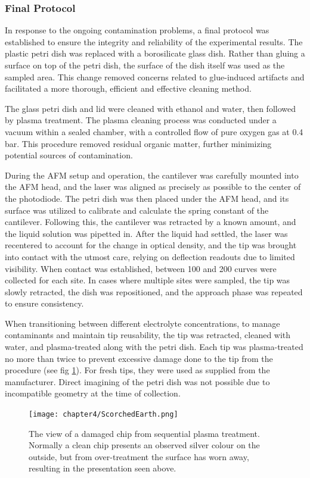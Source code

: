 \subsubsection{Final Protocol}

In response to the ongoing contamination problems, a final protocol was established to ensure the integrity and reliability of the experimental results. The plastic petri dish was replaced with a borosilicate glass dish. Rather than gluing a surface on top of the petri dish, the surface of the dish itself was used as the sampled area. This change removed concerns related to glue-induced artifacts and facilitated a more thorough, efficient and effective cleaning method.

The glass petri dish and lid were cleaned with ethanol and water, then followed by plasma treatment. The plasma cleaning process was conducted under a vacuum within a sealed chamber, with a controlled flow of pure oxygen gas at 0.4 bar. This procedure  removed residual organic matter, further minimizing potential sources of contamination.

During the AFM setup and operation, the cantilever was carefully mounted into the AFM head, and the laser was aligned as precisely as possible to the center of the photodiode. The petri dish was then placed under the AFM head, and its surface was utilized to calibrate and calculate the spring constant of the cantilever. Following this, the cantilever was retracted by a known amount, and the liquid solution was pipetted in. After the liquid had settled, the laser was recentered to account for the change in optical density, and the tip was brought into contact with the utmost care,  relying on deflection readouts due to limited visibility. When contact was established, between 100 and 200 curves were collected for each site. In cases where multiple sites were sampled, the tip was slowly retracted, the dish was repositioned, and the approach phase was repeated to ensure consistency.

When transitioning between different electrolyte concentrations, to manage contaminants and maintain tip reusability, the tip was retracted, cleaned with water, and plasma-treated along with the petri dish. Each tip was plasma-treated no more than twice to prevent excessive damage done to the tip from the procedure (see fig \ref{fig:ScorchedEarth}). For fresh tips, they were used as supplied from the manufacturer. Direct imagining of the petri dish was not possible due to incompatible geometry at the time of collection. 
\begin{figure}[h!]    
        \begin{center}
          \texttt{[image: chapter4/ScorchedEarth.png]}
\end{center}
\caption{The view of a damaged chip from sequential plasma treatment. Normally a clean chip presents an observed silver colour on the outside, but from over-treatment the surface has worn away, resulting in the presentation seen above.}
\label{fig:ScorchedEarth}                 
\end{figure}

